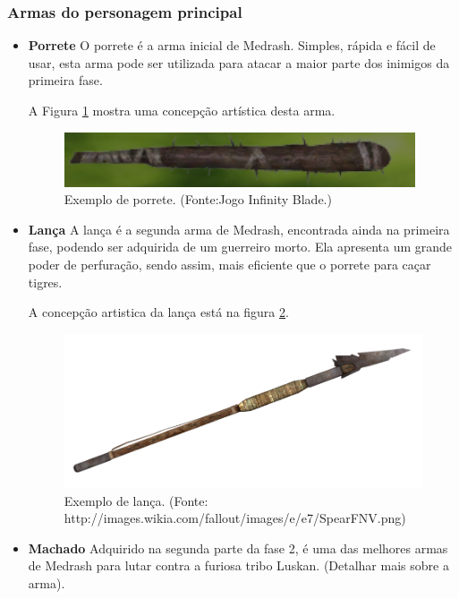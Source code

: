 \subsubsection{Armas do personagem principal}
\begin{itemize}
\item {\bf Porrete}
O porrete é a arma inicial de Medrash. Simples, rápida e fácil de usar,
 esta arma pode ser utilizada para atacar a maior parte dos inimigos da
 primeira fase.

A Figura \ref{img:porrete} mostra uma concepção artística desta arma.

\begin{figure}[H]
 \centering
 \includegraphics[scale=1]{Imagens/porrete01.png}
 \caption{Exemplo de porrete. (Fonte:Jogo Infinity Blade.)}
\label{img:porrete}
\end{figure}

\item {\bf Lança}
A lança é a segunda arma de Medrash, encontrada ainda na primeira fase,
 podendo ser adquirida de um guerreiro morto. Ela apresenta um grande poder
 de perfuração, sendo assim, mais eficiente que o porrete para caçar
 tigres.

A concepção artistica da lança está na figura \ref{img:lanca}.

\begin{figure}[H]
 \centering
 \includegraphics[scale=0.6]{Imagens/lanca01.png}
 \caption{Exemplo de lança. (Fonte: http://images.wikia.com/fallout/images/e/e7/SpearFNV.png)}
\label{img:lanca}
\end{figure}


\item {\bf Machado}
Adquirido na segunda parte da fase 2, é uma das melhores armas de Medrash
 para lutar contra a furiosa tribo Luskan. (Detalhar mais sobre a arma).


\end{itemize}
